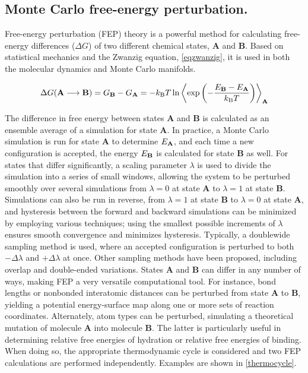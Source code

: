 \documentclass[12pt]{report}
\begin{document}
\subsection{Monte Carlo free-energy perturbation.}

Free-energy perturbation (FEP) theory is a powerful method for calculating free-energy differences ($\Delta G$) of two different chemical states, \textbf{A} and \textbf{B}. Based on statistical mechanics and the Zwanzig equation,\cite{zwanzig} \cref{eqzwanzig}, it is used in both the molecular dynamics and Monte Carlo manifolds.
\vspace*{0.01cm}

\vspace*{-0.4cm}
\begin{equation}
\label{eqzwanzig}
\Delta G(\textrm{\textbf{A}} \longrightarrow \textrm{\textbf{B}}) = G_\textrm{\textbf{B}} - G_\textrm{\textbf{A}} = -k_{\textnormal{B}} T \ln \left\langle \textrm{exp} \left(- \frac{E_\textrm{\textbf{B}} - E_\textrm{\textbf{A}}}{k_{\textnormal{B}} T} \right) \right\rangle_\textrm{\textbf{A}}
\end{equation}
\vspace*{-0.5cm}

The difference in free energy between states \textbf{A} and \textbf{B} is calculated as an ensemble average of a simulation for state \textbf{A}. In practice, a Monte Carlo simulation is run for state \textbf{A} to determine $E_{\textrm{\textbf{A}}}$, and each time a new configuration is accepted, the energy $E_{\textrm{\textbf{B}}}$ is calculated for state \textbf{B} as well. For states that differ significantly, a scaling parameter $\lambda$ is used to divide the simulation into a series of small windows, allowing the system to be perturbed smoothly over several simulations from $\lambda = 0$ at state \textbf{A} to $\lambda = 1$ at state \textbf{B}. Simulations can also be run in reverse, from $\lambda = 1$ at state \textbf{B} to $\lambda = 0$ at state \textbf{A}, and hysteresis between the forward and backward simulations can be minimized by employing various techniques; using the smallest possible increments of $\lambda$ ensures smooth convergence and minimizes hysteresis. Typically, a doublewide sampling method is used, where an accepted configuration is perturbed to both $-\Delta\lambda$ and $+\Delta\lambda$ at once. Other sampling methods have been proposed, including overlap and double-ended variations.\cite{thomas} States \textbf{A} and \textbf{B} can differ in any number of ways, making FEP a very versatile computational tool. For instance, bond lengths or nonbonded interatomic distances can be perturbed from state \textbf{A} to \textbf{B}, yielding a potential energy-surface map along one or more sets of reaction coordinates. Alternately, atom types can be perturbed, simulating a theoretical mutation of molecule \textbf{A} into molecule \textbf{B}. The latter is particularly useful in determining relative free energies of hydration or relative free energies of binding. When doing so, the appropriate thermodynamic cycle is considered and two FEP calculations are performed independently. Examples are shown in \cref{thermocycle}.
\end{document}
